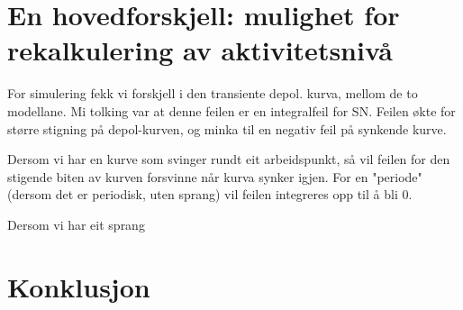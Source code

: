 	\section{En hovedforskjell: mulighet for rekalkulering av aktivitetsnivå}
	For simulering fekk vi forskjell i den transiente depol. kurva, mellom de to modellane.
	Mi tolking var at denne feilen er en integralfeil for SN. Feilen økte for større stigning på depol-kurven, og minka til en negativ feil på synkende kurve.
	
	Dersom vi har en kurve som svinger rundt eit arbeidspunkt, så vil feilen for den stigende biten av kurven forsvinne når kurva synker igjen. For en "periode" (dersom det er periodisk, uten sprang) vil feilen integreres opp til å bli 0.

	Dersom vi har eit sprang 


	\section{ Konklusjon }
